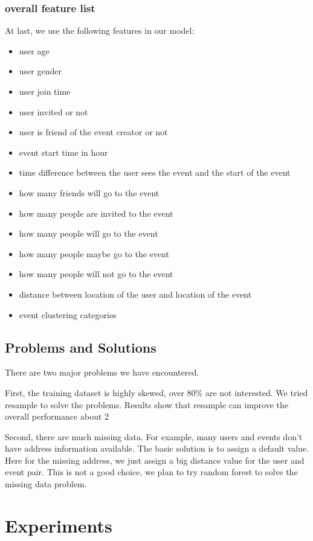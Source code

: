 \documentclass{article} %
\begin{document}
\subsubsection{overall feature list}
At last, we use the following features in our model:

\begin{itemize}
\item user age
\item user gender
\item user join time
\item user invited or not
\item user is friend of the event creator or not
\item event start time in hour
\item time difference between the user sees the event and the start of the event
\item how many friends will go to the event
\item how many people are invited to the event
\item how many people will go to the event
\item how many people maybe go to the event
\item how many people will not go to the event
\item distance between location of the user and location of the event
\item event clustering categories
\end{itemize}

\subsection{Problems and Solutions}

There are two major problems we have encountered.

First, the training dataset is highly skewed, over 80\% are not interested. We tried resample to solve the problems. Results show that resample can improve the overall performance about 2%

Second, there are much missing data. For example, many users and events don't have address information available. The basic solution is to assign a default value. Here for the missing address, we just assign a big distance value for the user and event pair. This is not a good choice, we plan to try random forest to solve the missing data problem. 

\section{Experiments}
\end{document}
